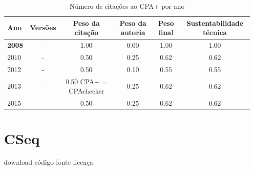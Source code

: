 \begin{table}[H]
\caption{Número de citações ao CPA+  por ano}
\centering
\begin{tabular}{| l | c | c | c | c | c |}
  \hline
  Ano & Versões & Peso da citação & Peso da autoria & Peso final & Sustentabilidade técnica \\
  \hline
            {\bf 2008}
          &
          -
          &
          1.00
          &
          0.00
          &
          1.00
          &
            {\color{blue} 1.00}
          \\
\hline
            2010
          &
          -
          &
          0.50
          &
          0.25
          &
          0.62
          &
            {\color{blue} 0.62}
          \\
\hline
            2012
          &
          -
          &
          0.50
          &
          0.10
          &
          0.55
          &
            {\color{blue} 0.55}
          \\
\hline
            2013
          &
          -
          &
          0.50
            {\tiny CPA+ = CPAchecker}
          &
          0.25
          &
          0.62
          &
            {\color{blue} 0.62}
          \\
\hline
            2015
          &
          -
          &
          0.50
          &
          0.25
          &
          0.62
          &
            {\color{blue} 0.62}
          \\
\hline
\end{tabular}
\end{table}



\section{CSeq}
\checkmark download
\checkmark código fonte
\checkmark licença


